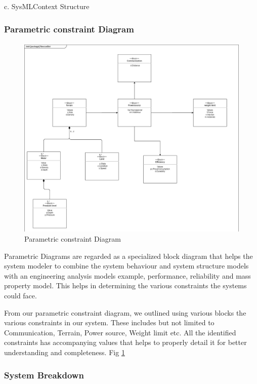 \documentclass[10pt,journal,compsoc]{IEEEtran}
\begin{document}
c. SysMLContext Structure 


\subsubsection{Parametric constraint Diagram}

\begin{figure}[!h]
\includegraphics[scale=0.26]{parametric}
\caption{Parametric constraint Diagram}
\label{fig:parametricDiagram}
\end{figure}

Parametric Diagrams are regarded as a specialized block diagram that helps the system modeler to combine the system behaviour and system structure models with an engineering analysis models example, performance, reliability and mass property model. This helps in determining the various constraints the systems could face.

From our parametric constraint diagram, we outlined using various blocks the various constraints in our system. These includes but not limited to Communication, Terrain, Power source, Weight limit etc. All the identified constraints has accompanying values that helps to properly detail it for better understanding and completeness. Fig \ref{fig:parametricDiagram}

\subsubsection{System Breakdown}
\end{document}
